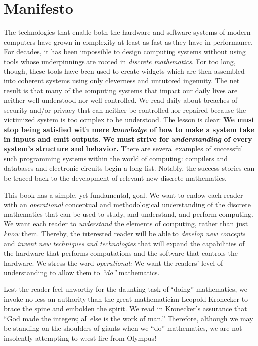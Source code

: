
\chapter*{Manifesto}

The technologies that enable both the hardware and software systems of modern computers have grown in complexity at least as fast as they have in performance.  For decades, it has been impossible to design computing systems without using tools whose underpinnings are rooted
in {\it discrete mathematics}.  For too long, though, these tools have been used to create widgets which are then assembled into coherent systems using only cleverness and untutored ingenuity.  The net result is that many of the computing systems that impact our daily lives are neither well-understood nor well-controlled.  We read daily about breaches of security and/or privacy that can neither be controlled nor repaired because the victimized system is too complex to be understood.  The lesson is clear: {\bf We must stop being satisfied with mere {\em knowledge} of how to make a system take in inputs and emit outputs.  We must strive for {\em understanding} of every system's structure and behavior.}  There are several examples of successful such programming systems within the world of computing: compilers and databases and electronic circuits begin a long list.  Notably, the success stories can be traced back to the development of relevant new discrete mathematics.

This book has a simple, yet fundamental, goal.  We want to endow each reader with an {\em operational} conceptual and methodological understanding of the discrete mathematics that can be used to study, and understand, and perform computing.  We want each reader to {\em understand} the elements of computing, rather than just {\em know} them.  Thereby, the interested reader will be able to {\em develop new concepts} and {\em invent new techniques and technologies} that will expand the capabilities of the hardware that performs computations and the software that controls the hardware.  We stress the word {\it operational:}  We want the readers' level of understanding to allow them to {\em ``do''} mathematics.

\bigskip

Lest the reader feel unworthy for the daunting task of ``doing'' mathematics, we invoke no less an authority than the great mathematician Leopold Kronecker to brace
the spine and embolden the spirit.  We read in \cite{Bell86} Kronecker's assurance that ``God made the integers; all else is the work of man.''  Therefore, although we may be standing on the
shoulders of giants when we ``do'' mathematics, we are not insolently attempting to wrest fire from Olympus!

